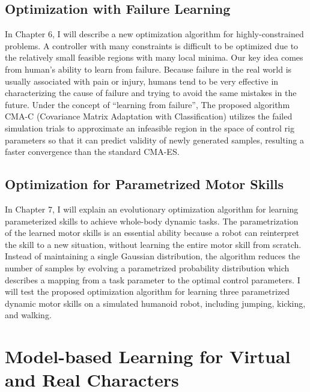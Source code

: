 \subsection{Optimization with Failure Learning}
In Chapter 6, I will describe a new optimization algorithm for
highly-constrained problems.
A controller with many constraints is difficult to be optimized due to the
relatively small feasible regions with many local minima.
Our key idea comes from human’s ability to learn from failure. 
Because failure in the real world is usually associated with pain or injury,
humans tend to be very effective in characterizing the cause of failure and
trying to avoid the same mistakes in the future. 
Under the concept of ``learning from failure'', The proposed algorithm CMA-C
(Covariance Matrix Adaptation with Classification) utilizes the failed
simulation trials to approximate an infeasible region in the space of control
rig parameters so that it can predict validity of newly generated samples,
resulting a faster convergence than the standard CMA-ES.

\subsection{Optimization for Parametrized Motor Skills}
In Chapter 7, I will explain an evolutionary optimization algorithm for
learning parameterized skills to achieve whole-body dynamic tasks.
The parametrization of the learned motor skills is an essential ability
because a robot can reinterpret the skill to a new situation, without
learning the entire motor skill from scratch.
Instead of maintaining a single Gaussian distribution, 
the algorithm reduces the number of samples by evolving a parametrized
probability distribution which describes a mapping from a task parameter
to the optimal control parameters.
I will test the proposed optimization algorithm for learning three parametrized
dynamic motor skills on a simulated humanoid robot, including jumping,
kicking, and walking. 

\section{Model-based Learning for Virtual and Real Characters}

